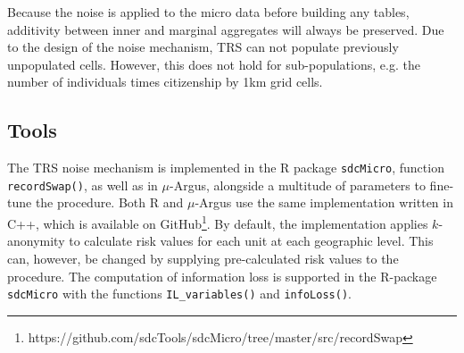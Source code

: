 \noindent Because the noise is applied to the micro data before building any tables, additivity between inner and marginal aggregates will always be preserved.
Due to the design of the noise mechanism, TRS can not populate previously unpopulated cells. However, this does not hold for sub-populations, e.g. the number of individuals times citizenship by 1km grid cells.  

\subsection{Tools}\label{sec:trstools}

The TRS noise mechanism is implemented in the R package \texttt{sdcMicro}, function \texttt{recordSwap()}, as well as in $\mu$-Argus, alongside a multitude of parameters to fine-tune the procedure. Both R and $\mu$-Argus use the same implementation written in C++, which is available on GitHub\footnote{
    https://github.com/sdcTools/sdcMicro/tree/master/src/recordSwap}.
By default, the implementation applies $k$-anonymity to calculate risk values for each unit at each geographic level. This can, however, be changed by supplying pre-calculated risk values to the procedure.
The computation of information loss is supported in the R-package \texttt{sdcMicro} with the functions \texttt{IL\_variables()} and \texttt{infoLoss()}.




    

\newpage
